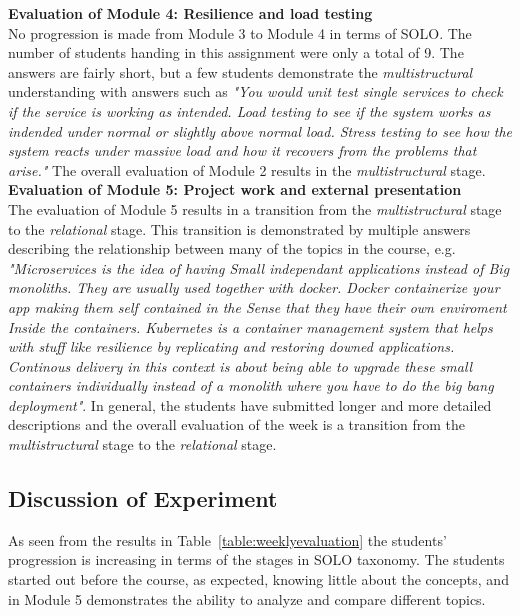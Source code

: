 \noindent\textbf{Evaluation of Module 4: Resilience and load testing}\\ 
No progression is made from Module 3 to Module 4 in terms of SOLO. The number of students handing in this assignment were only a total of 9. The answers are fairly short, but a few students demonstrate the \textit{multistructural} understanding with answers such as \textit{"You would unit test single services to check if the service is working as intended. Load testing to see if the system works as indended under normal or slightly above normal load. Stress testing to see how the system reacts under massive load and how it recovers from the problems that arise."}  The overall evaluation of Module 2 results in the \textit{multistructural} stage. \\

\noindent\textbf{Evaluation of Module 5: Project work and external presentation}\\ 
The evaluation of Module 5 results in a transition from the \textit{multistructural} stage to the \textit{relational} stage. This transition is demonstrated by multiple answers describing the relationship between many of the topics in the course, e.g. \textit{"Microservices is the idea of having Small independant applications instead of Big monoliths. They are usually used together with docker. Docker containerize your app making them self contained in the Sense that they have their own enviroment Inside the containers. Kubernetes is a container management system that helps with stuff like resilience by replicating and restoring downed applications. Continous delivery in this context is about being able to upgrade these small containers individually instead of a monolith where you have to do the big bang deployment"}. In general, the students have submitted longer and more detailed descriptions and the overall evaluation of the week is a transition from the \textit{multistructural} stage to the \textit{relational} stage.


\subsection*{Discussion of Experiment}
As seen from the results in Table~\ref{table:weeklyevaluation} the students' progression is increasing in terms of the stages in SOLO taxonomy. The students started out before the course, as expected, knowing little about the concepts, and in Module 5 demonstrates the ability to analyze and compare different topics. \\

